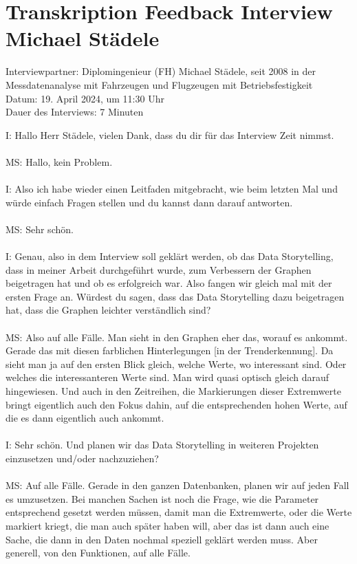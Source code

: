 \section{Transkription Feedback Interview Michael Städele}
\label{appendix:interview_ende_staedele}
Interviewpartner: Diplomingenieur (FH) Michael Städele, seit 2008 in der Messdatenanalyse mit Fahrzeugen und Flugzeugen mit Betriebsfestigkeit\\
Datum: 19. April 2024, um 11:30 Uhr\\
Dauer des Interviews: 7 Minuten\\

\begin{linenumbers}
\noindent
I: Hallo Herr Städele, vielen Dank, dass du dir für das Interview Zeit nimmst.\\\\
MS: Hallo, kein Problem.\\\\
I: Also ich habe wieder einen Leitfaden mitgebracht, wie beim letzten Mal und würde einfach Fragen stellen und du kannst dann darauf antworten.\\\\
MS: Sehr schön.\\\\
I: Genau, also in dem Interview soll geklärt werden, ob das Data Storytelling, dass in meiner Arbeit durchgeführt wurde, zum Verbessern der Graphen beigetragen hat und ob es erfolgreich war. Also fangen wir gleich mal mit der ersten Frage an. Würdest du sagen, dass das Data Storytelling dazu beigetragen hat, dass die Graphen leichter verständlich sind?\\\\
MS: Also auf alle Fälle. Man sieht in den Graphen eher das, worauf es ankommt. Gerade das mit diesen farblichen Hinterlegungen [in der Trenderkennung]. Da sieht man ja auf den ersten Blick gleich, welche Werte, wo interessant sind. Oder welches die interessanteren Werte sind. Man wird quasi optisch gleich darauf hingewiesen. Und auch in den Zeitreihen, die Markierungen dieser Extremwerte bringt eigentlich auch den Fokus dahin, auf die entsprechenden hohen Werte, auf die es dann eigentlich auch ankommt.\\\\
I: Sehr schön. Und planen wir das Data Storytelling in weiteren Projekten einzusetzen und/oder nachzuziehen?\\\\
MS: Auf alle Fälle. Gerade in den ganzen Datenbanken, planen wir auf jeden Fall es umzusetzen. Bei manchen Sachen ist noch die Frage, wie die Parameter entsprechend gesetzt werden müssen, damit man die Extremwerte, oder die Werte markiert kriegt, die man auch später haben will, aber das ist dann auch eine Sache, die dann in den Daten nochmal speziell geklärt werden muss. Aber generell, von den Funktionen, auf alle Fälle.\\\\

\end{linenumbers}
